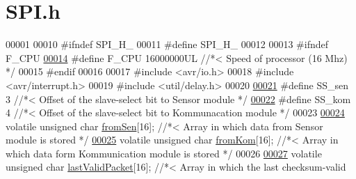 \hypertarget{styr_2styr_2_s_p_i_8h_source}{}\section{S\+P\+I.\+h}
\label{styr_2styr_2_s_p_i_8h_source}

\begin{DoxyCode}
00001 
00010 \textcolor{preprocessor}{#ifndef SPI\_H\_}
00011 \textcolor{preprocessor}{#define SPI\_H\_}
00012 
00013 \textcolor{preprocessor}{#ifndef F\_CPU}
\hypertarget{styr_2styr_2_s_p_i_8h_source.tex_l00014}{}\hyperlink{styr_2styr_2_s_p_i_8h_a43bafb28b29491ec7f871319b5a3b2f8}{00014} \textcolor{preprocessor}{#define F\_CPU 16000000UL //*< Speed of processor (16 Mhz) */}
00015 \textcolor{preprocessor}{#endif}
00016 
00017 \textcolor{preprocessor}{#include <avr/io.h>}
00018 \textcolor{preprocessor}{#include <avr/interrupt.h>}
00019 \textcolor{preprocessor}{#include <util/delay.h>}
00020 
\hypertarget{styr_2styr_2_s_p_i_8h_source.tex_l00021}{}\hyperlink{styr_2styr_2_s_p_i_8h_a58ac62acddf451691b748c71454e0137}{00021} \textcolor{preprocessor}{#define SS\_sen 3 //*< Offset of the slave-select bit to Sensor module */}
\hypertarget{styr_2styr_2_s_p_i_8h_source.tex_l00022}{}\hyperlink{styr_2styr_2_s_p_i_8h_acbbd0eb471ac972ee5d3bb2563a6c72e}{00022} \textcolor{preprocessor}{#define SS\_kom 4 //*< Offset of the slave-select bit to Kommunacation module */}
00023 
\hypertarget{styr_2styr_2_s_p_i_8h_source.tex_l00024}{}\hyperlink{styr_2styr_2_s_p_i_8h_a2963725e5681e7e146da28127b3e09d3}{00024} \textcolor{keyword}{volatile} \textcolor{keywordtype}{unsigned} \textcolor{keywordtype}{char} \hyperlink{styr_2styr_2_s_p_i_8h_a2963725e5681e7e146da28127b3e09d3}{fromSen}[16]; \textcolor{comment}{//*< Array in which data from Sensor module is stored */}
\hypertarget{styr_2styr_2_s_p_i_8h_source.tex_l00025}{}\hyperlink{styr_2styr_2_s_p_i_8h_a4c1a44ecc2e0f0cf45cf9b6c0bc3e645}{00025} \textcolor{keyword}{volatile} \textcolor{keywordtype}{unsigned} \textcolor{keywordtype}{char} \hyperlink{styr_2styr_2_s_p_i_8h_a4c1a44ecc2e0f0cf45cf9b6c0bc3e645}{fromKom}[16]; \textcolor{comment}{//*< Array in which data form Kommunication module is stored */}
00026 
\hypertarget{styr_2styr_2_s_p_i_8h_source.tex_l00027}{}\hyperlink{styr_2styr_2_s_p_i_8h_ab15ab508531e452eb0768f69f7c588da}{00027} \textcolor{keyword}{volatile} \textcolor{keywordtype}{unsigned} \textcolor{keywordtype}{char} \hyperlink{styr_2styr_2_s_p_i_8h_ab15ab508531e452eb0768f69f7c588da}{lastValidPacket}[16]; \textcolor{comment}{//*< Array in which the last checksum-valid
}
\end{DoxyCode}
